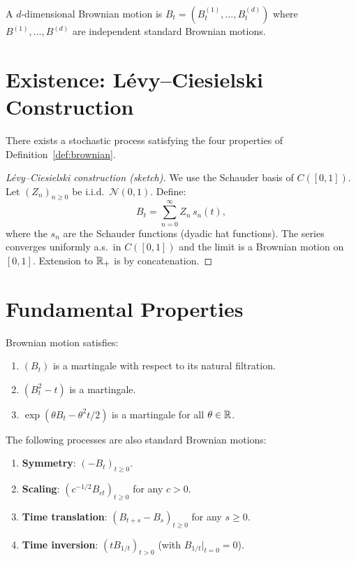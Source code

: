 \begin{definition}
A $d$-dimensional Brownian motion is $B_t = (B_t^{(1)}, \ldots, B_t^{(d)})$
where $B^{(1)}, \ldots, B^{(d)}$ are independent standard Brownian motions.
\end{definition}

\section{Existence: L\'evy--Ciesielski Construction}

\begin{theorem}
\label{thm:brownian_existence}
There exists a stochastic process satisfying the four properties of
Definition~\ref{def:brownian}.
\end{theorem}

\begin{proof}[L\'evy--Ciesielski construction (sketch)]
We use the Schauder basis of $C([0,1])$. Let $(Z_n)_{n \geq 0}$ be i.i.d.\
$\mathcal{N}(0,1)$. Define:
\[
  B_t = \sum_{n=0}^{\infty} Z_n \, s_n(t),
\]
where the $s_n$ are the Schauder functions (dyadic hat functions). The series
converges uniformly a.s.\ in $C([0,1])$ and the limit is a Brownian motion
on $[0,1]$. Extension to $\mathbb{R}_+$ is by concatenation.
\end{proof}

\section{Fundamental Properties}

\begin{proposition}
Brownian motion satisfies:
\begin{enumerate}
  \item $(B_t)$ is a martingale with respect to its natural filtration.
  \item $(B_t^2 - t)$ is a martingale.
  \item $\exp(\theta B_t - \theta^2 t/2)$ is a martingale for all $\theta \in \mathbb{R}$.
\end{enumerate}
\end{proposition}

\begin{proposition}
\label{prop:invariance}
The following processes are also standard Brownian motions:
\begin{enumerate}
  \item \textbf{Symmetry}: $(-B_t)_{t \geq 0}$.
  \item \textbf{Scaling}: $(c^{-1/2} B_{ct})_{t \geq 0}$ for any $c > 0$.
  \item \textbf{Time translation}: $(B_{t+s} - B_s)_{t \geq 0}$ for any $s \geq 0$.
  \item \textbf{Time inversion}: $(tB_{1/t})_{t > 0}$ (with $B_{1/t}\big|_{t=0} = 0$).
\end{enumerate}
\end{proposition}

